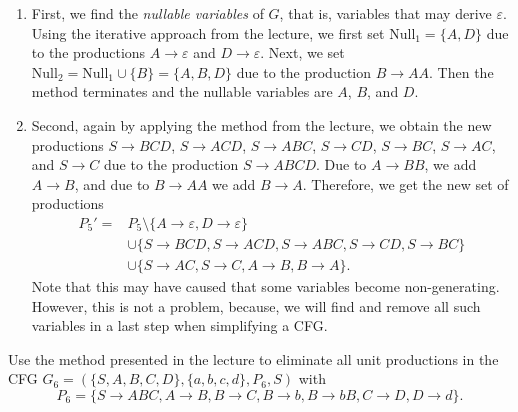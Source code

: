 \documentclass{exercise}
\begin{document}
  \begin{solution}
    \begin{enumerate}[label=\Roman*.]
      \item First, we find the \emph{nullable variables} of $G$, that is, variables that may
        derive $\varepsilon$.  Using the iterative approach from the lecture, we first
        set $\mathrm{Null}_1=\{A,D\}$ due to the productions $A\to\varepsilon$ and $D\to\varepsilon$.
        Next, we set $\mathrm{Null}_2=\mathrm{Null}_1\cup\{B\}=\{A,B,D\}$ due to the
        production $B\to AA$.  Then the method terminates and the nullable variables
        are $A$, $B$, and $D$.
      \item Second, again by  applying the method from the lecture, we obtain the new
        productions $S\to BCD$, $S\to ACD$, $S\to ABC$, $S\to CD$, $S\to BC$, $S\to AC$,
        and $S\to C$ due to the production $S\to ABCD$.
        Due to $A\to BB$, we add $A\to B$, and due to $B\to AA$ we add $B\to A$.  Therefore,
        we get the new set of productions
        \begin{align*}
          P_5' = {} & P_5 \setminus \{A\to\varepsilon, D\to\varepsilon\} \\
                    & \cup \{S\to BCD, S\to ACD, S\to ABC, S\to CD, S\to BC\}\\
                    & \cup \{S\to AC, S\to C, A \to B, B \to A\}.
        \end{align*}
        Note that this may have caused that some variables become non-generating.
        However, this is not a problem, because, we will find and remove all
        such variables in a last step when simplifying a CFG.
    \end{enumerate}
  \end{solution}

\subtask Use the method presented in the lecture to eliminate all unit productions in
  the CFG $G_6=(\{S,A,B,C,D\},\{a,b,c,d\},P_6,S)$ with
  \[ P_6 =\{ S\to ABC, A\to B, B\to C, B\to b, B\to bB, C\to D, D\to d\}. \]
\end{document}
